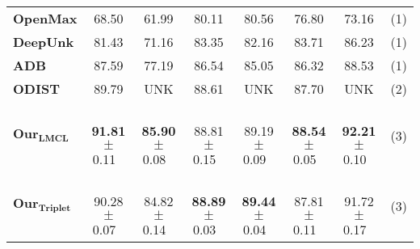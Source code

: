 \documentclass[runningheads]{llncs}
\begin{document}
\begin{table}[t]
\begin{adjustbox}{width=1\textwidth}
\begin{tabular}{l|cc|cc|cc|c}
\textbf{OpenMax}            & 68.50                                 & 61.99                                                                                  & 80.11                                 & 80.56                                                                                  & 76.80                                 & 73.16                                                                                  & (1)  \\
\textbf{DeepUnk}            & 81.43                                 & 71.16                                                                                  & 83.35                                 & 82.16                                                                                  & 83.71                                 & 86.23                                                                                  & (1)  \\
\textbf{ADB}                & 87.59                                 & 77.19                                                                                  & 86.54                                 & 85.05                                                                                  & 86.32                                 & 88.53                                                                                  & (1)  \\
\textbf{ODIST}              & 89.79                                 & UNK                                                                                    & 88.61                                 & UNK                                                                                    & 87.70                                 & UNK                                                                                    & (2)  \\ \hline
$\mathbf{Our}_\mathbf{LMCL}$    & \,\,  \textbf{91.81} $\pm$  0.11   \,\, &\,\,  \textbf{85.90} $\pm$  0.08  \,\,    & \,\, 88.81 $\pm$  0.15 \,\,  &\,\,  89.19 $\pm$  0.09  \,\,  & \,\, \textbf{88.54} $\pm$  0.05  \,\,  & \,\,  \textbf{92.21} $\pm$  0.10  \,\,  & (3)  \\
$\mathbf{Our}_\mathbf{Triplet}$ & \,\,  90.28 $\pm$  0.07  \,\,   & \,\, 84.82 $\pm$  0.14 \,\,    &\,\, \textbf{88.89} $\pm$  0.03 \,\,     & \,\, \textbf{89.44} $\pm$  0.04  \,\,   &\,\,  87.81 $\pm$  0.11   \,\,  &\,\,  91.72 $\pm$  0.17   \,\,  & (3) 
\end{tabular}
\end{adjustbox}
\end{table}
\end{document}
